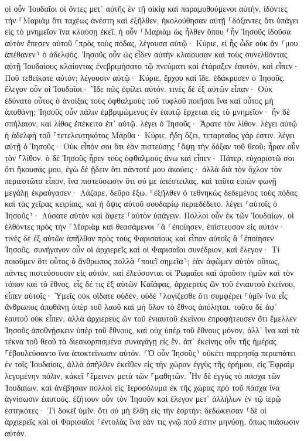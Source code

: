 \documentclass[twoside, 9pt]{extreport}
\begin{document}
οἱ οὖν Ἰουδαῖοι οἱ ὄντες μετ᾽ αὐτῆς ἐν τῇ οἰκίᾳ καὶ παραμυθούμενοι αὐτήν, ἰδόντες τὴν ⸀Μαριὰμ ὅτι ταχέως ἀνέστη καὶ ἐξῆλθεν, ἠκολούθησαν αὐτῇ ⸀δόξαντες ὅτι ὑπάγει εἰς τὸ μνημεῖον ἵνα κλαύσῃ ἐκεῖ. 
ἡ οὖν ⸀Μαριὰμ ὡς ἦλθεν ὅπου ⸀ἦν Ἰησοῦς ἰδοῦσα αὐτὸν ἔπεσεν αὐτοῦ ⸀πρὸς τοὺς πόδας, λέγουσα αὐτῷ· Κύριε, εἰ ἦς ὧδε οὐκ ἄν ⸂μου ἀπέθανεν⸃ ὁ ἀδελφός. 
Ἰησοῦς οὖν ὡς εἶδεν αὐτὴν κλαίουσαν καὶ τοὺς συνελθόντας αὐτῇ Ἰουδαίους κλαίοντας ἐνεβριμήσατο τῷ πνεύματι καὶ ἐτάραξεν ἑαυτόν, 
καὶ εἶπεν· Ποῦ τεθείκατε αὐτόν; λέγουσιν αὐτῷ· Κύριε, ἔρχου καὶ ἴδε. 
ἐδάκρυσεν ὁ Ἰησοῦς. 
ἔλεγον οὖν οἱ Ἰουδαῖοι· Ἴδε πῶς ἐφίλει αὐτόν. 
τινὲς δὲ ἐξ αὐτῶν εἶπαν· Οὐκ ἐδύνατο οὗτος ὁ ἀνοίξας τοὺς ὀφθαλμοὺς τοῦ τυφλοῦ ποιῆσαι ἵνα καὶ οὗτος μὴ ἀποθάνῃ; 
Ἰησοῦς οὖν πάλιν ἐμβριμώμενος ἐν ἑαυτῷ ἔρχεται εἰς τὸ μνημεῖον· ἦν δὲ σπήλαιον, καὶ λίθος ἐπέκειτο ἐπ᾽ αὐτῷ. 
λέγει ὁ Ἰησοῦς· Ἄρατε τὸν λίθον. λέγει αὐτῷ ἡ ἀδελφὴ τοῦ ⸀τετελευτηκότος Μάρθα· Κύριε, ἤδη ὄζει, τεταρταῖος γάρ ἐστιν. 
λέγει αὐτῇ ὁ Ἰησοῦς· Οὐκ εἶπόν σοι ὅτι ἐὰν πιστεύσῃς ⸀ὄψῃ τὴν δόξαν τοῦ θεοῦ; 
ἦραν οὖν τὸν ⸀λίθον. ὁ δὲ Ἰησοῦς ἦρεν τοὺς ὀφθαλμοὺς ἄνω καὶ εἶπεν· Πάτερ, εὐχαριστῶ σοι ὅτι ἤκουσάς μου, 
ἐγὼ δὲ ᾔδειν ὅτι πάντοτέ μου ἀκούεις· ἀλλὰ διὰ τὸν ὄχλον τὸν περιεστῶτα εἶπον, ἵνα πιστεύσωσιν ὅτι σύ με ἀπέστειλας. 
καὶ ταῦτα εἰπὼν φωνῇ μεγάλῃ ἐκραύγασεν· Λάζαρε, δεῦρο ἔξω. 
⸀ἐξῆλθεν ὁ τεθνηκὼς δεδεμένος τοὺς πόδας καὶ τὰς χεῖρας κειρίαις, καὶ ἡ ὄψις αὐτοῦ σουδαρίῳ περιεδέδετο. λέγει ⸂αὐτοῖς ὁ Ἰησοῦς⸃· Λύσατε αὐτὸν καὶ ἄφετε ⸀αὐτὸν ὑπάγειν. 
Πολλοὶ οὖν ἐκ τῶν Ἰουδαίων, οἱ ἐλθόντες πρὸς τὴν ⸀Μαριὰμ καὶ θεασάμενοι ⸀ἃ ⸀ἐποίησεν, ἐπίστευσαν εἰς αὐτόν· 
τινὲς δὲ ἐξ αὐτῶν ἀπῆλθον πρὸς τοὺς Φαρισαίους καὶ εἶπαν αὐτοῖς ἃ ⸀ἐποίησεν Ἰησοῦς. 
συνήγαγον οὖν οἱ ἀρχιερεῖς καὶ οἱ Φαρισαῖοι συνέδριον, καὶ ἔλεγον· Τί ποιοῦμεν ὅτι οὗτος ὁ ἄνθρωπος πολλὰ ⸂ποιεῖ σημεῖα⸃; 
ἐὰν ἀφῶμεν αὐτὸν οὕτως, πάντες πιστεύσουσιν εἰς αὐτόν, καὶ ἐλεύσονται οἱ Ῥωμαῖοι καὶ ἀροῦσιν ἡμῶν καὶ τὸν τόπον καὶ τὸ ἔθνος. 
εἷς δέ τις ἐξ αὐτῶν Καϊάφας, ἀρχιερεὺς ὢν τοῦ ἐνιαυτοῦ ἐκείνου, εἶπεν αὐτοῖς· Ὑμεῖς οὐκ οἴδατε οὐδέν, 
οὐδὲ ⸀λογίζεσθε ὅτι συμφέρει ⸀ὑμῖν ἵνα εἷς ἄνθρωπος ἀποθάνῃ ὑπὲρ τοῦ λαοῦ καὶ μὴ ὅλον τὸ ἔθνος ἀπόληται. 
τοῦτο δὲ ἀφ᾽ ἑαυτοῦ οὐκ εἶπεν, ἀλλὰ ἀρχιερεὺς ὢν τοῦ ἐνιαυτοῦ ἐκείνου ἐπροφήτευσεν ὅτι ἔμελλεν Ἰησοῦς ἀποθνῄσκειν ὑπὲρ τοῦ ἔθνους, 
καὶ οὐχ ὑπὲρ τοῦ ἔθνους μόνον, ἀλλ᾽ ἵνα καὶ τὰ τέκνα τοῦ θεοῦ τὰ διεσκορπισμένα συναγάγῃ εἰς ἕν. 
ἀπ᾽ ἐκείνης οὖν τῆς ἡμέρας ⸀ἐβουλεύσαντο ἵνα ἀποκτείνωσιν αὐτόν. 
⸂Ὁ οὖν Ἰησοῦς⸃ οὐκέτι παρρησίᾳ περιεπάτει ἐν τοῖς Ἰουδαίοις, ἀλλὰ ἀπῆλθεν ἐκεῖθεν εἰς τὴν χώραν ἐγγὺς τῆς ἐρήμου, εἰς Ἐφραὶμ λεγομένην πόλιν, κἀκεῖ ⸀ἔμεινεν μετὰ τῶν ⸀μαθητῶν. 
Ἦν δὲ ἐγγὺς τὸ πάσχα τῶν Ἰουδαίων, καὶ ἀνέβησαν πολλοὶ εἰς Ἱεροσόλυμα ἐκ τῆς χώρας πρὸ τοῦ πάσχα ἵνα ἁγνίσωσιν ἑαυτούς. 
ἐζήτουν οὖν τὸν Ἰησοῦν καὶ ἔλεγον μετ᾽ ἀλλήλων ἐν τῷ ἱερῷ ἑστηκότες· Τί δοκεῖ ὑμῖν; ὅτι οὐ μὴ ἔλθῃ εἰς τὴν ἑορτήν; 
δεδώκεισαν ⸀δὲ οἱ ἀρχιερεῖς καὶ οἱ Φαρισαῖοι ⸀ἐντολὰς ἵνα ἐάν τις γνῷ ποῦ ἐστιν μηνύσῃ, ὅπως πιάσωσιν αὐτόν. 
\end{document}

